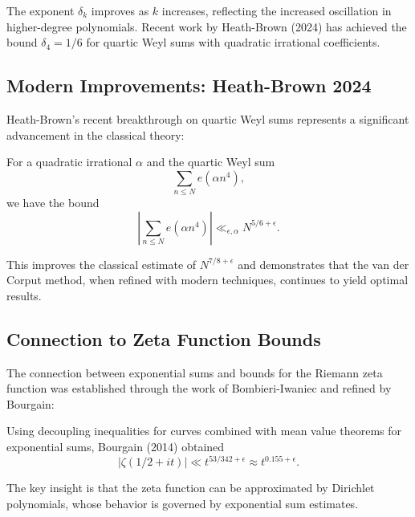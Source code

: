 \begin{remark}
The exponent $\delta_k$ improves as $k$ increases, reflecting the increased oscillation in higher-degree polynomials. Recent work by Heath-Brown (2024) has achieved the bound $\delta_4 = 1/6$ for quartic Weyl sums with quadratic irrational coefficients.
\end{remark}

\subsection{Modern Improvements: Heath-Brown 2024}

Heath-Brown's recent breakthrough on quartic Weyl sums represents a significant advancement in the classical theory:

\begin{theorem}
For a quadratic irrational $\alpha$ and the quartic Weyl sum
\begin{equation}
\sum_{n \leq N} e(\alpha n^4),
\end{equation}
we have the bound
\begin{equation}
\left| \sum_{n \leq N} e(\alpha n^4) \right| \ll_{\epsilon,\alpha} N^{5/6 + \epsilon}.
\end{equation}
\end{theorem}

This improves the classical estimate of $N^{7/8 + \epsilon}$ and demonstrates that the van der Corput method, when refined with modern techniques, continues to yield optimal results.

\subsection{Connection to Zeta Function Bounds}

The connection between exponential sums and bounds for the Riemann zeta function was established through the work of Bombieri-Iwaniec and refined by Bourgain:

\begin{theorem}
Using decoupling inequalities for curves combined with mean value theorems for exponential sums, Bourgain (2014) obtained
\begin{equation}
|\zeta(1/2 + it)| \ll t^{53/342 + \epsilon} \approx t^{0.155 + \epsilon}.
\end{equation}
\end{theorem}

The key insight is that the zeta function can be approximated by Dirichlet polynomials, whose behavior is governed by exponential sum estimates.

